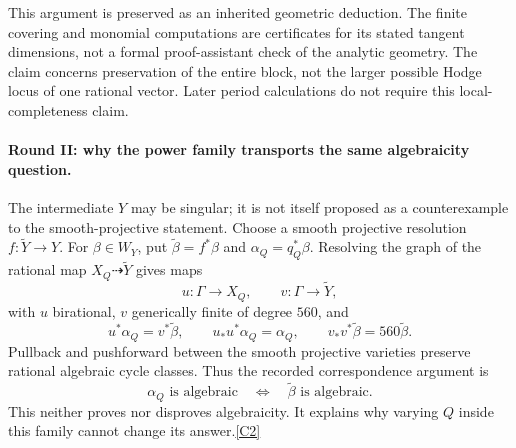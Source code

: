 \documentclass[11pt]{article}
\newcommand{\src}[1]{\hyperlink{src:#1}{[#1]}}
\begin{document}
This argument is preserved as an inherited geometric deduction. The finite
covering and monomial computations are certificates for its stated tangent
dimensions, not a formal proof-assistant check of the analytic geometry. The
claim concerns preservation of the entire block, not the larger possible
Hodge locus of one rational vector. Later period calculations do not require
this local-completeness claim.

\paragraph{Round II: why the power family transports the same algebraicity question.}
The intermediate $Y$ may be singular; it is not itself proposed as a
counterexample to the smooth-projective statement. Choose a smooth
projective resolution $f:\widetilde Y\to Y$. For $\beta\in W_Y$, put
$\widetilde\beta=f^*\beta$ and $\alpha_Q=q_Q^*\beta$. Resolving the graph
of the rational map $X_Q\dashrightarrow\widetilde Y$ gives maps
\[
 u:\Gamma\longrightarrow X_Q,\qquad
 v:\Gamma\longrightarrow\widetilde Y,
\]
with $u$ birational, $v$ generically finite of degree $560$, and
\[
 u^*\alpha_Q=v^*\widetilde\beta,\qquad
 u_*u^*\alpha_Q=\alpha_Q,\qquad
 v_*v^*\widetilde\beta=560\widetilde\beta.
\]
Pullback and pushforward between the smooth projective varieties preserve
rational algebraic cycle classes. Thus the recorded correspondence argument
is
\begin{equation}\label{hodge:algebraicity-invariance}
 \alpha_Q\text{ is algebraic}
 \quad\Longleftrightarrow\quad
 \widetilde\beta\text{ is algebraic}.
\end{equation}
This neither proves nor disproves algebraicity. It explains why varying $Q$
inside this family cannot change its answer.\src{C2}
\end{document}
